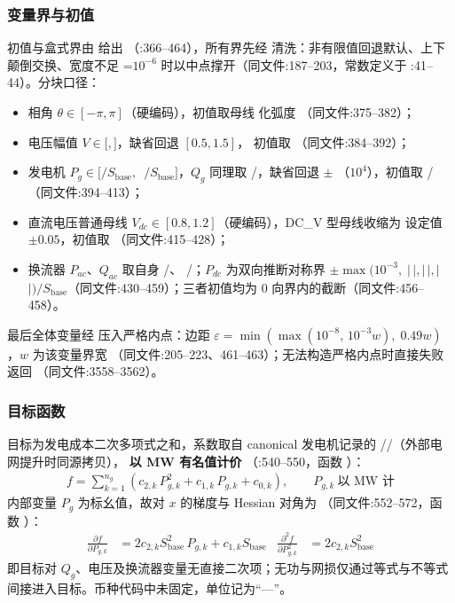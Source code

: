 \subsubsection*{变量界与初值}
初值与盒式界由  给出
（:366--464），所有界先经
 清洗：非有限值回退默认、上下颠倒交换、宽度不足
=$10^{-6}$ 时以中点撑开（同文件:187--203，常数定义于
:41--44）。分块口径：
\begin{itemize}
  \item 相角 $\theta\in[-\pi,\pi]$（硬编码），初值取母线  化弧度
        （同文件:375--382）；
  \item 电压幅值 $V\in[$$,$$]$，缺省回退 $[0.5,1.5]$，
        初值取 （同文件:384--392）；
  \item 发电机 $P_g\in[$$/S_{\mathrm{base}},\,$
        $/S_{\mathrm{base}}]$，$Q_g$ 同理取
        /，缺省回退 $\pm$
        （$10^4$），初值取 /（同文件:394--413）；
  \item 直流电压普通母线 $V_{dc}\in[0.8,1.2]$（硬编码），DC\_V 型母线收缩为
        设定值 $\pm0.05$，初值取 （同文件:415--428）；
  \item 换流器 $P_{ac}$、$Q_{ac}$ 取自身 /、
        /；$P_{dc}$ 为双向推断对称界
        $\pm\max(10^{-3},\;|\,$$|,|\,$$|,|\,$
        $|)/S_{\mathrm{base}}$（同文件:430--459）；三者初值均为
        0 向界内的截断（同文件:456--458）。
\end{itemize}
最后全体变量经  压入严格内点：边距
$\varepsilon=\min(\max(10^{-8},\,10^{-3}w),\;0.49w)$，$w$ 为该变量界宽
（同文件:205--223、461--463）；无法构造严格内点时直接失败返回
（同文件:3558--3562）。

\subsubsection*{目标函数}
目标为发电成本二次多项式之和，系数取自 canonical 发电机记录的
//（外部电网提升时同源拷贝），
\textbf{以 MW 有名值计价}
（:540--550，函数
）：
\begin{align*}
f = \sum_{k=1}^{n_g}\left(c_{2,k}\,P_{g,k}^{2} + c_{1,k}\,P_{g,k} + c_{0,k}\right),
\qquad P_{g,k}\ \text{以 MW 计}
\end{align*}
内部变量 $P_g$ 为标幺值，故对 $x$ 的梯度与 Hessian 对角为
（同文件:552--572，函数 ）：
\begin{align*}
\frac{\partial f}{\partial P_{g,k}} &=
  2c_{2,k}S_{\mathrm{base}}^{2}\,P_{g,k} + c_{1,k}S_{\mathrm{base}} &
\frac{\partial^{2} f}{\partial P_{g,k}^{2}} &= 2c_{2,k}S_{\mathrm{base}}^{2}
\end{align*}
即目标对 $Q_g$、电压及换流器变量无直接二次项；无功与网损仅通过等式与不等式
间接进入目标。币种代码中未固定，单位记为``—''。

